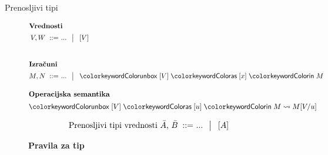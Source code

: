 \documentclass{beamer}
\theoremstyle{definition} %
\theoremstyle{plain} %
\begin{document}
	\begin{frame}{Prenosljivi tipi}

		\begin{figure}[hp]
			\parbox{\textwidth}{
				\centering
				\tiny
				\begin{align*}
				\shortintertext{\textbf{Vrednosti}}
				V, W
				\bnfis & ... \,\bnfor\! \tmboxed{V}     
				\\[5ex]
				\shortintertext{\textbf{Izračuni}}
				M, N
				\bnfis & ... \,\bnfor\! \tmunbox{V}{x}{M}
				\end{align*}
			} 
		\end{figure}
		
		\begin{figure}[tp]
			\centering
			\tiny
			\begin{align*}
			\shortintertext{\textbf{Operacijska semantika}}
			\tmunbox{V}{u}{M} & \reduces M[V/u]
			\end{align*}
		\end{figure}
	
		\begin{figure}[tb]
			\parbox{\textwidth}{
				\centering
				\tiny
				\begin{align*}
				\text{Prenosljivi tipi vrednosti $\bar{A}$, $\bar{B}$}
				\mathrel{\;{:}{:}{=}\ } & ... \,\mathrel{\;\big|\ \ }\! [A]
				\end{align*}
			} 
		\end{figure}
	
		
		\begin{figure}[tp]
			\centering
			\tiny
			\textbf{Pravila za tip}
			\begin{mathpar}
			\end{mathpar}
		\end{figure}
		
	\end{frame}
\end{document}

